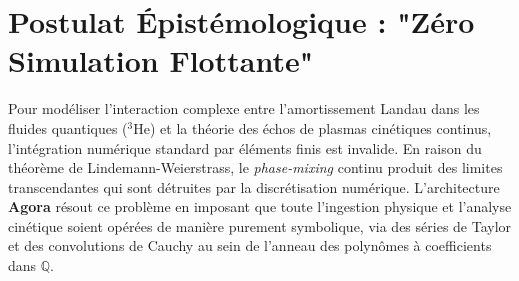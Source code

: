 \documentclass[11pt, a4paper]{article}
\begin{document}
\begin{abstract}
L'application de l'Intelligence Artificielle à la physique cinétique se heurte à deux obstacles : l'hallucination sémantique des modèles génératifs et les artefacts de discrétisation des solveurs numériques (Float64), qui détruisent la nature continue du mélange de phase (Amortissement Landau). Ce document présente un sous-ensemble open source de l'architecture multi-agents \textbf{Agora}, conçu pour contourner ces écueils. En imposant une collaboration stricte dans le corps des rationnels ($\mathbb{Q}$) entre un stage spécialisé en fluides quantiques et un stage expert en équations cinétiques, le système a dérivé la signature algébrique exacte d'une réponse de Volterra du second ordre au sein d'un liquide de Fermi (présentée initialement comme un écho de plasma non-linéaire ; cette qualification est rétractée, voir la note ci-dessus), générant une séquence mathématique prête pour la vérification formelle dans \textbf{Lean 4}.
\end{abstract}

\section{Postulat Épistémologique : "Zéro Simulation Flottante"}
Pour modéliser l'interaction complexe entre l'amortissement Landau dans les fluides quantiques ($^3$He) et la théorie des échos de plasmas cinétiques continus, l'intégration numérique standard par éléments finis est invalide. En raison du théorème de Lindemann-Weierstrass, le \textit{phase-mixing} continu produit des limites transcendantes qui sont détruites par la discrétisation numérique. L'architecture \textbf{Agora} résout ce problème en imposant que toute l'ingestion physique et l'analyse cinétique soient opérées de manière purement symbolique, via des séries de Taylor et des convolutions de Cauchy au sein de l'anneau des polynômes à coefficients dans $\mathbb{Q}$.
\end{document}
